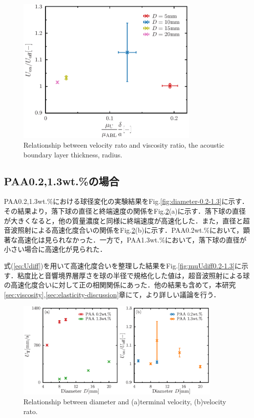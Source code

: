 \begin{figure}[ht]
    \centering
    \includegraphics[width=0.8\textwidth]{./5-Results/diameter-0.5/mu_Udiff.eps}
    \caption{Relationship between velocity rato and viscosity ratio, the acoustic boundary layer thickness, radius.}
    \label{fig:muUdiff0.5}
\end{figure}

\clearpage

\subsection{PAA0.2,1.3wt.\%の場合}
PAA0.2,1.3wt.\%における球径変化の実験結果をFig.\ref{fig:diameter-0.2-1.3}に示す．その結果より，落下球の直径と終端速度の関係をFig.\ref{fig:diaUT0.2-1.3}(a)に示す．落下球の直径が大きくなると，他の質量濃度と同様に終端速度が高速化した．また，直径と超音波照射による高速化度合いの関係をFig.\ref{fig:diaUT0.2-1.3}(b)に示す．PAA0.2wt.\%において，顕著な高速化は見られなかった．一方で，PAA1.3wt.\%において，落下球の直径が小さい場合に高速化が見られた．

式(\ref{eq:Udiff})を用いて高速化度合いを整理した結果をFig.\ref{fig:muUdiff0.2-1.3}に示す．粘度比と音響境界層厚さを球の半径で規格化した値は，超音波照射による球の高速化度合いに対して正の相関関係にあった．他の結果も含めて，本研究\ref{sec:viscosity},\ref{sec:elasticity-discussion}章にて，より詳しい議論を行う．

\begin{figure}[ht]
    \centering
    \includegraphics[width=0.9\textwidth]{./5-Results/diameter-0.2-1.3/diaUT_Udiff.eps}
    \caption{Relationship between diameter and (a)terminal velocity, (b)velocity rato.}
    \label{fig:diaUT0.2-1.3}
\end{figure}

